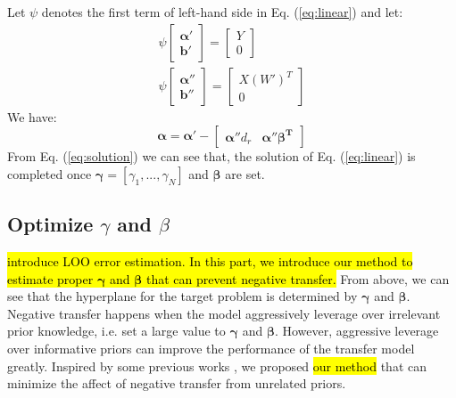 Let $\psi$ denotes the first term of left-hand side in Eq. (\ref{eq:linear}) and let:
\begin{equation}
\begin{array}{c}
 {\psi}\left[ {\begin{array}{*{20}{c}}
{\boldsymbol{\alpha} '}\\
{\boldsymbol{b}'}
\end{array}} \right] = \left[ {\begin{array}{*{20}{c}}
Y\\
0
\end{array}} \right]\\
{\psi}\left[ {\begin{array}{*{20}{c}}
{\boldsymbol{\alpha} ''}\\
{\boldsymbol{b}''}
\end{array}} \right] = \left[ {\begin{array}{*{20}{c}}
{X{{\left( {W'} \right)}^T}}\\
0
\end{array}} \right]
\end{array}
\end{equation}
We have:
\begin{equation}\label{eq:solution}
 \boldsymbol{\alpha}  = \boldsymbol{\alpha} ' - \left[ {\begin{array}{*{20}{c}}
 {\boldsymbol{\alpha} ''{d_r}}&{{\boldsymbol{\alpha} ''\boldsymbol{\beta ^T}}}
 \end{array}} \right]
\end{equation}
From Eq. (\ref{eq:solution}) we can see that, the solution of Eq. (\ref{eq:linear}) is completed once $\boldsymbol{\gamma}=\left[ \gamma_1,...,\gamma_N\right] $ and $\boldsymbol{\beta}$ are set.

\subsection{Optimize $\gamma$ and $\beta$}
\hl{introduce LOO error estimation. In this part, we introduce our method to estimate proper $\boldsymbol{\gamma}$ and $\boldsymbol{\beta}$ that can prevent negative transfer.}
From above, we can see that the hyperplane for the target problem is determined by $\boldsymbol{\gamma}$ and $\boldsymbol{\beta}$. Negative transfer happens when the model aggressively leverage over irrelevant prior knowledge, i.e. set a  large value to $\boldsymbol{\gamma}$ and $\boldsymbol{\beta}$. However, aggressive leverage over informative priors can improve the performance of the transfer model greatly. Inspired by some previous works \cite{tommasi2014learning} \cite{kuzborskij2013n}, we proposed \hl{our method} that can minimize the affect of negative transfer from unrelated priors.

